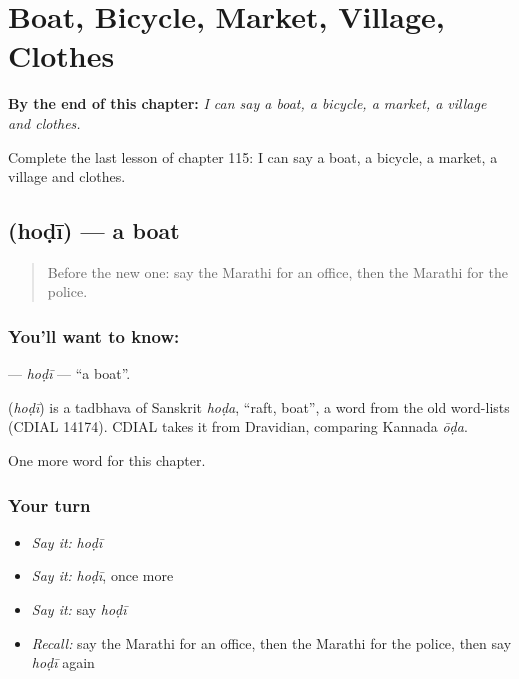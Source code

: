 
\chapter{Boat, Bicycle, Market, Village, Clothes}
\label{ch:mr-boat-bicycle-market-village-clothes}

\begin{chapteropening}
\textbf{By the end of this chapter:} \emph{I can say a boat, a bicycle, a market, a village and clothes.}

Complete the last lesson of chapter 115: I can say a boat, a bicycle, a market, a village and clothes.
\end{chapteropening}

\section[\texorpdfstring{\mr{होडी} (hoḍī)}{होडी (hoḍī)}]{ (hoḍī) — a boat}

\label{lesson:MR-C115-hodi}



\begin{quote}
Before the new one: say the Marathi for an office, then the Marathi for the police.
\end{quote}

\subsection*{You'll want to know: }
\textbf{} — \emph{hoḍī} — \textquotedblleft{}a boat\textquotedblright{}.

\begin{cousinweb}
\textbf{} (\emph{hoḍī}) is a tadbhava of Sanskrit \emph{hoḍa}, \textquotedblleft{}raft, boat\textquotedblright{}, a word from the old word-lists (CDIAL 14174). CDIAL takes it from Dravidian, comparing Kannada \emph{ōḍa}.
\end{cousinweb}

\begin{grammarlens}[title={What you've built}]
One more word for this chapter.
\end{grammarlens}

\subsection*{Your turn}
\begin{itemize}
\raggedright
  \item \emph{Say it:} \emph{hoḍī}
  \item \emph{Say it:} \emph{hoḍī}, once more
  \item \emph{Say it:} say \emph{hoḍī}
  \item \emph{Recall:} say the Marathi for an office, then the Marathi for the police, then say \emph{hoḍī} again
\end{itemize}

